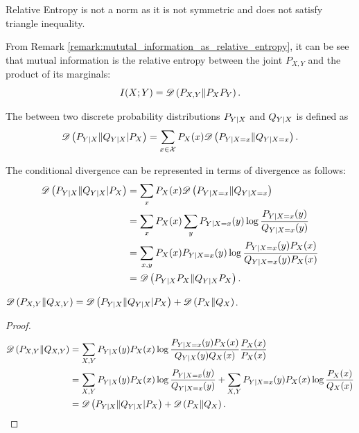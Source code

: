 \documentclass[11pt,a4paper]{article}
\begin{document}
\begin{remark}
    Relative Entropy is not a norm as it is not symmetric and does not satisfy triangle inequality.
\end{remark}

\begin{remark}
    From Remark \ref{remark:mututal_information_as_relative_entropy}, it can be see that mutual information is the relative entropy between the joint $P_{X,Y}$ and the product of its marginals:
    \begin{equation*}
        I(X;Y) = \mathscr{D} \left(P_{X,Y}\|P_XP_Y\right).
    \end{equation*}
\end{remark}

\begin{definition}
    The  between two discrete probability distributions $P_{Y|X}$ and $Q_{Y|X}$ is defined as
    \begin{equation*}
        \mathscr{D} \left(P_{Y|X}\|Q_{Y|X} | P_X\right) = \sum_{x\in\mathcal{X}} P_X(x) \mathscr{D} \left(P_{Y|X=x}\|Q_{Y|X=x}\right).
    \end{equation*}
\end{definition}

\begin{remark}
    The conditional divergence can be represented in terms of divergence as follows:
    \begin{align*}
        \mathscr{D} \left(P_{Y|X}\|Q_{Y|X} | P_X\right) &= \sum_{x}P_{X}(x) \mathscr{D} \left(P_{Y|X=x}\|Q_{Y|X=x}\right) \\
            & = \sum_{x}P_{X}(x) \sum_{y} P_{{Y|X} = x} (y) \log{\frac{P_{{Y|X}= x}(y)}{Q_{{Y|X}= x}(y)}} \\
            & = \sum_{x, y} P_{X}(x) P_{{Y|X} = x} (y) \log{\frac{P_{{Y|X}= x}(y) P_X(x)}{Q_{{Y|X}= x}(y) P_X(x)}} \\
            & = \mathscr{D} \left(P_{Y|X} P_X\|Q_{Y|X} P_X\right).
    \end{align*}
\end{remark}

\begin{theorem}
    $\mathscr{D} \left(P_{X,Y}\|Q_{X,Y}\right) = \mathscr{D} \left(P_{Y|X}\|Q_{Y|X} | P_X\right) + \mathscr{D} \left(P_X\|Q_X\right)$.
\end{theorem}

\begin{proof}
    \begin{align*}
        \mathscr{D} \left(P_{X,Y}\|Q_{X,Y}\right) &= \sum_{{X,Y}} P_{Y|X} (y) P_X(x) \log{\frac{P_{{Y|X}= x}(y) P_X(x)}{Q_{Y|X}(y) Q_X(x)} \frac{P_X(x)}{P_X(x)}} \\
            &= \sum_{{X,Y}} P_{Y|X} (y) P_X(x) \log{\frac{P_{{Y|X}= x}(y) }{Q_{{Y|X}=x}(y)}} + \sum_{{X,Y}} P_{{Y|X}=x} (y) P_X(x) \log{ \frac{P_X(x)}{Q_X(x)}} \\
            &= \mathscr{D} \left(P_{Y|X}\|Q_{Y|X} | P_X\right) + \mathscr{D} \left(P_X\|Q_X\right).
    \end{align*}
\end{proof}
    
\end{document}
